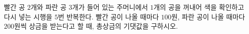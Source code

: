 빨간 공 $2$개와 파란 공 $3$개가 들어 있는 주머니에서 $1$개의 공을 꺼내어 색을 확인하고 다시 넣는 시행을 $5$번 반복한다. 빨간 공이 나올 때마다 $100$원, 파란 공이 나올 때마다 $200$원씩 상금을 받는다고 할 때, 총상금의 기댓값을 구하시오.
